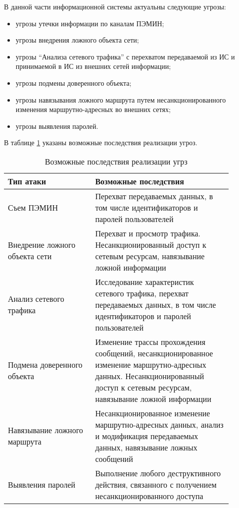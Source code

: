 В данной части информационной системы актуальны следующие угрозы:

\begin{itemize}
 \item угрозы утечки информации по каналам ПЭМИН;
 \item угрозы внедрения ложного объекта сети;
 \item угрозы ``Анализа сетевого трафика'' с перехватом передаваемой из ИС и принимаемой в ИС из внешних сетей информации;
 \item угрозы подмены доверенного объекта;
 \item угрозы навязывания ложного маршрута путем несанкционированного изменения маршрутно-адресных во внешних сетях;
 \item угрозы выявления паролей.
\end{itemize}

В таблице \ref{tab:threats} указаны возможные последствия реализации угроз.

\begin{center}
 \begin{longtable}[h]{|p{0.35\linewidth}|p{0.55\linewidth}|}
  \caption{Возможные последствия реализации угрз} \label{tab:threats} \\
  \hline
  Тип атаки & Возможные последствия \\ 
  \hline
  Съем ПЭМИН & Перехват   передаваемых   данных,  в том числе идентификаторов и паролей пользователей \\
  \hline
  Внедрение ложного объекта сети & Перехват и просмотр трафика. Несанкционированный доступ  к  сетевым  ресурсам, навязывание ложной информации \\
  \hline
  Анализ сетевого трафика & Исследование   характеристик   сетевого   трафика, перехват   передаваемых   данных,  в том числе идентификаторов и паролей пользователей\\
  \hline
  Подмена доверенного объекта & Изменение    трассы    прохождения    сообщений, несанкционированное    изменение   маршрутно-адресных  данных.  Несанкционированный  доступ  к сетевым ресурсам, навязывание ложной информации\\
  \hline
  Навязывание ложного маршрута & Несанкционированное    изменение    маршрутно-адресных    данных,    анализ    и    модификация передаваемых    данных,   навязывание    ложных сообщений\\
  \hline
  Выявления паролей & Выполнение   любого   деструктивного   действия, связанного  с  получением  несанкционированного доступа\\
  \hline
 \end{longtable}
\end{center}